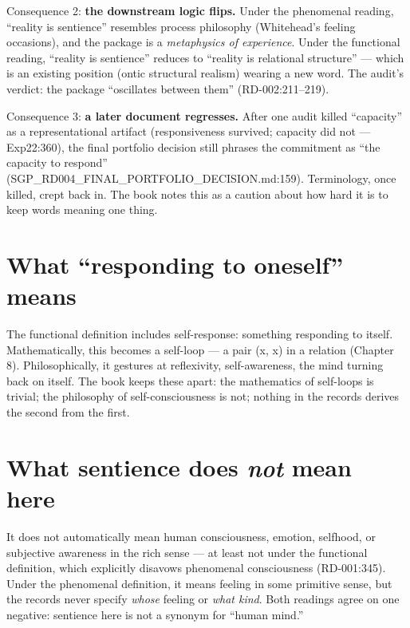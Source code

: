 \documentclass[
  11pt,
]{book}
\begin{document}
Consequence 2: \textbf{the downstream logic flips.} Under the phenomenal
reading, ``reality is sentience'' resembles process philosophy
(Whitehead's feeling occasions), and the package is a \emph{metaphysics
of experience}. Under the functional reading, ``reality is sentience''
reduces to ``reality is relational structure'' --- which is an existing
position (ontic structural realism) wearing a new word. The audit's
verdict: the package ``oscillates between them'' (RD-002:211--219).

Consequence 3: \textbf{a later document regresses.} After one audit
killed ``capacity'' as a representational artifact (responsiveness
survived; capacity did not --- Exp22:360), the final portfolio decision
still phrases the commitment as ``the capacity to respond''
(SGP\_RD004\_FINAL\_PORTFOLIO\_DECISION.md:159). Terminology, once
killed, crept back in. The book notes this as a caution about how hard
it is to keep words meaning one thing.

\section{What ``responding to oneself''
means}\label{what-responding-to-oneself-means}

The functional definition includes self-response: something responding
to itself. Mathematically, this becomes a self-loop --- a pair (x, x) in
a relation (Chapter 8). Philosophically, it gestures at reflexivity,
self-awareness, the mind turning back on itself. The book keeps these
apart: the mathematics of self-loops is trivial; the philosophy of
self-consciousness is not; nothing in the records derives the second
from the first.

\section{\texorpdfstring{What sentience does \emph{not} mean
here}{What sentience does not mean here}}\label{what-sentience-does-not-mean-here}

It does not automatically mean human consciousness, emotion, selfhood,
or subjective awareness in the rich sense --- at least not under the
functional definition, which explicitly disavows phenomenal
consciousness (RD-001:345). Under the phenomenal definition, it means
feeling in some primitive sense, but the records never specify
\emph{whose} feeling or \emph{what kind}. Both readings agree on one
negative: sentience here is not a synonym for ``human mind.''
\end{document}
